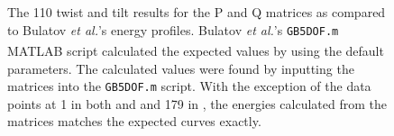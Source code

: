 \documentclass[12pt]{report}
\begin{document}
\begin{figure}[ht!]
 \centering
 
 \quad
 \caption[A comparison of the \textlangle{}110\textrangle{} copper curves with the calculated results.]{\label{appfig:compare110} The \textlangle{}110\textrangle{} twist \protect{} and tilt \protect{} results for the P and Q matrices as compared to Bulatov \emph{et al.}'s energy profiles. Bulatov \emph{et al.}'s \lstinline!GB5DOF.m! MATLAB\textsuperscript{\textregistered} script calculated the expected values by using the default parameters.  The calculated values were found by inputting the matrices into the \lstinline!GB5DOF.m! script. With the exception of the data points at 1\textdegree{} in both \protect{} and \protect{} and 179\textdegree{} in \protect{}, the energies calculated from the matrices matches the expected curves exactly.}
\end{figure}
\end{document}
